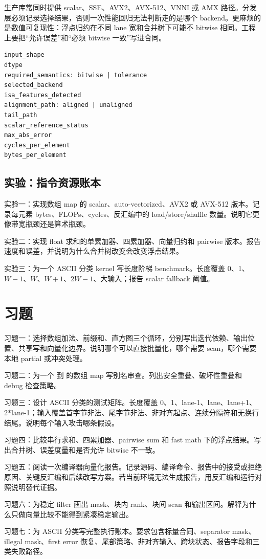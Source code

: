 生产库常同时提供 scalar、SSE、AVX2、AVX-512、VNNI 或 AMX 路径。分发层必须记录选择结果，否则一次性能回归无法判断走的是哪个 backend。更麻烦的是数值可复现性：浮点归约在不同 lane 宽和合并树下可能不 bitwise 相同。工程上要把“允许误差”和“必须 bitwise 一致”写进合同。

\begin{lstlisting}[numbers=none,caption={SIMD backend dispatch report}]
input_shape
dtype
required_semantics: bitwise | tolerance
selected_backend
isa_features_detected
alignment_path: aligned | unaligned
tail_path
scalar_reference_status
max_abs_error
cycles_per_element
bytes_per_element
\end{lstlisting}

\subsection{实验：指令资源账本}

\begin{exercisebox}
实验一：实现数组 map 的 scalar、auto-vectorized、AVX2 或 AVX-512 版本。记录每元素 bytes、FLOPs、cycles、反汇编中的 load/store/shuffle 数量。说明它更像带宽瓶颈还是算术瓶颈。

实验二：实现 float 求和的单累加器、四累加器、向量归约和 pairwise 版本。报告速度和误差，并说明为什么合并树改变会改变浮点结果。

实验三：为一个 ASCII 分类 kernel 写长度阶梯 benchmark。长度覆盖 0、1、\(W-1\)、\(W\)、\(W+1\)、\(2W-1\)、大输入；报告 scalar fallback 阈值。
\end{exercisebox}

\section{习题}

\begin{exercisebox}
习题一：选择数组加法、前缀和、直方图三个循环，分别写出迭代依赖、输出位置、共享写和向量化边界。说明哪个可以直接批量化，哪个需要 scan，哪个需要本地 partial 或冲突处理。

习题二：为一个  到  的数组 map 写别名审查。列出安全重叠、破坏性重叠和 debug 检查策略。

习题三：设计 ASCII 分类的测试矩阵。长度覆盖 0、1、lane-1、lane、lane+1、2*lane-1；输入覆盖首字节非法、尾字节非法、非对齐起点、连续分隔符和无换行结尾。说明每个输入攻击哪条假设。

习题四：比较串行求和、四累加器、pairwise sum 和 fast math 下的浮点结果。写出合并树、误差度量和是否允许 bitwise 不一致。

习题五：阅读一次编译器向量化报告。记录源码、编译命令、报告中的接受或拒绝原因、关键反汇编和后续改写方案。若当前环境无法生成报告，用反汇编和运行对照说明替代证据。

习题六：为稳定 filter 画出 mask、块内 rank、块间 scan 和输出区间。解释为什么只做向量比较不能得到紧凑稳定输出。

习题七：为 ASCII 分类写完整执行账本。要求包含标量合同、separator mask、illegal mask、first error 恢复、尾部策略、非对齐输入、跨块状态、报告字段和三类失败路径。
\end{exercisebox}
